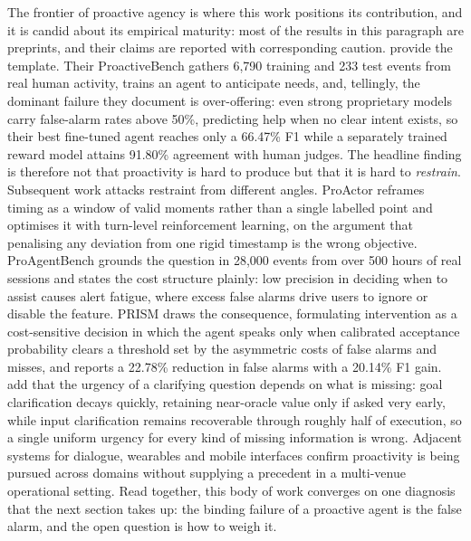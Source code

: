 The frontier of proactive agency is where this work positions its contribution,
and it is candid about its empirical maturity: most of the results in this
paragraph are preprints, and their claims are reported with corresponding
caution. \citet{lu_proactive_2024} provide the template. Their ProactiveBench
gathers 6,790 training and 233 test events from real human activity, trains an
agent to anticipate needs, and, tellingly, the dominant failure they document
is over-offering: even strong proprietary models carry false-alarm rates above
50\%, predicting help when no clear intent exists, so their best fine-tuned
agent reaches only a 66.47\% F1 while a separately trained reward model attains
91.80\% agreement with human judges. The headline finding is therefore not that
proactivity is hard to produce but that it is hard to \emph{restrain}.
Subsequent work attacks restraint from different angles. ProActor
\citep{ding_proactor_2026} reframes timing as a window of valid moments rather
than a single labelled point and optimises it with turn-level reinforcement
learning, on the argument that penalising any deviation from one rigid
timestamp is the wrong objective. ProAgentBench \citep{tang_proagentbench_2026}
grounds the question in 28,000 events from over 500 hours of real sessions and
states the cost structure plainly: low precision in deciding when to assist
causes alert fatigue, where excess false alarms drive users to ignore or
disable the feature. PRISM \citep{fu_prism_2026} draws the consequence,
formulating intervention as a cost-sensitive decision in which the agent speaks
only when calibrated acceptance probability clears a threshold set by the
asymmetric costs of false alarms and misses, and reports a 22.78\% reduction in
false alarms with a 20.14\% F1 gain. \citet{gulati_ask_2026} add that the
urgency of a clarifying question depends on what is missing: goal clarification
decays quickly, retaining near-oracle value only if asked very early, while
input clarification remains recoverable through roughly half of execution, so a
single uniform urgency for every kind of missing information is wrong. Adjacent
systems for dialogue, wearables and mobile interfaces
\citep{liu_proactiveeval_2025,yang_contextagent_2025,yang_fingertip_2025}
confirm proactivity is being pursued across domains without supplying a
precedent in a multi-venue operational setting. Read together, this body of
work converges on one diagnosis that the next section takes up: the binding
failure of a proactive agent is the false alarm, and the open question is how
to weigh it.

